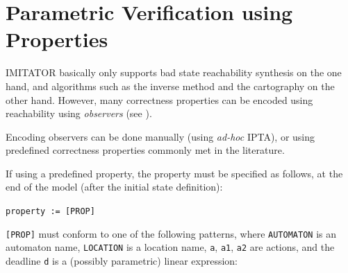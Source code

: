 \documentclass[a4paper,11pt]{report}
\makeatletter
\newcommand{\imitator}{\textsf{IMITATOR}}
\newcommand{\IPTA}{IPTA}
\newcommand{\styleIMI}[1]{\textcolor{imicolor}{\texttt{#1}}}
\newcommand{\adhoc}{\textcolor{colorok}{\textit{ad-hoc}\@}}
\makeatother
\begin{document}
\section{Parametric Verification using Properties}\label{ss:mode:prop}

\imitator{} basically only supports bad state reachability synthesis on the one hand, and algorithms such as the inverse method and the cartography on the other hand.
However, many correctness properties can be encoded using reachability using \emph{observers} (see \cite{ABL98,ABBL98,Andre13ICECCS}).

Encoding observers can be done manually (using \adhoc{} \IPTA{}), or using predefined correctness properties commonly met in the literature.

If using a predefined property, the property must be specified as follows, at the end of the model (after the initial state definition):

\styleIMI{property := [PROP]}

\styleIMI{[PROP]} must conform to one of the following patterns, where \styleIMI{AUTOMATON} is an automaton name, \styleIMI{LOCATION} is a location name, \styleIMI{a}, \styleIMI{a1}, \styleIMI{a2} are actions, and the deadline \styleIMI{d} is a (possibly parametric) linear expression:
\end{document}
